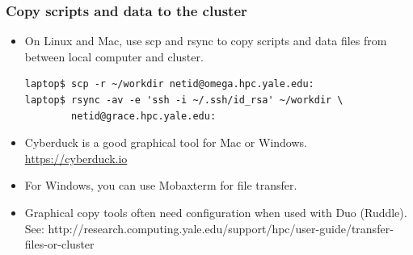 \documentclass[10pt]{beamer}
\begin{document}

\begin{frame}[fragile]
\frametitle{Copy scripts and data to the cluster}
\begin{itemize}
\item On Linux and Mac, use scp and rsync
to copy scripts and data files from between local computer and cluster.

\begin{verbatim}
laptop$ scp -r ~/workdir netid@omega.hpc.yale.edu:
laptop$ rsync -av -e 'ssh -i ~/.ssh/id_rsa' ~/workdir \
        netid@grace.hpc.yale.edu:
\end{verbatim}

\item Cyberduck is a good graphical tool for Mac or Windows.  \url{https://cyberduck.io}

\item For Windows, you can use Mobaxterm for file transfer. 

\item Graphical copy tools often need configuration when used with Duo (Ruddle).  See:
http://research.computing.yale.edu/support/hpc/user-guide/transfer-files-or-cluster
\end{itemize}

\end{frame}
\end{document}

